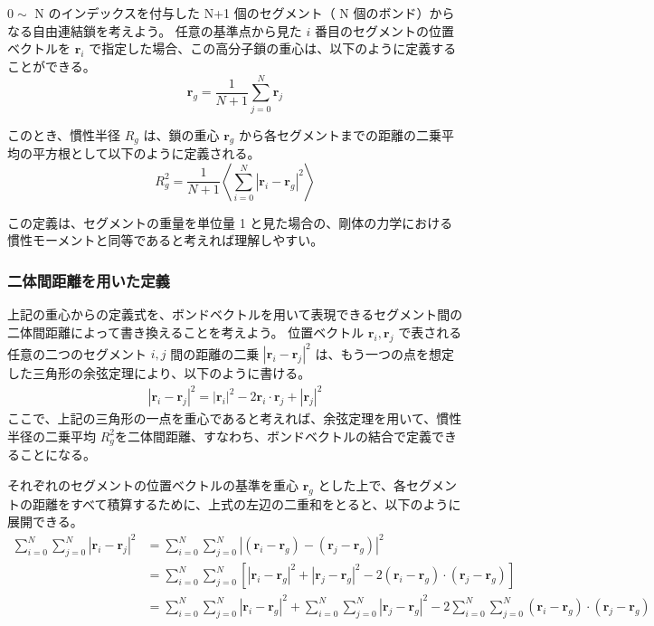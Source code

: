 \documentclass[a4paper,11pt]{ltjsarticle}
\begin{document}
\begin{appendix}
$0\sim$ N のインデックスを付与した N+1 個のセグメント（ N 個のボンド）からなる自由連結鎖を考えよう。
任意の基準点から見た $i$ 番目のセグメントの位置ベクトルを $\bm{r}_i$ で指定した場合、この高分子鎖の重心は、以下のように定義することができる。
\begin{equation*}
\bm{r}_g = \dfrac{1}{N+1} \sum_{j=0}^{N} \bm{r}_j
\end{equation*}

このとき、慣性半径 $R_g$ は、鎖の重心 $\bm{r}_g$ から各セグメントまでの距離の二乗平均の平方根として以下のように定義される。
\begin{equation*}
R_g^2 = \dfrac{1}{N+1} \left\langle \sum_{i=0}^{N} |\bm{r}_i - \bm{r}_g|^2 \right\rangle
\end{equation*}

この定義は、セグメントの重量を単位量 1 と見た場合の、剛体の力学における慣性モーメントと同等であると考えれば理解しやすい。

\subsubsection{二体間距離を用いた定義}

上記の重心からの定義式を、ボンドベクトルを用いて表現できるセグメント間の二体間距離によって書き換えることを考えよう。
位置ベクトル $\bm{r}_{i}, \bm{r}_{j}$ で表される任意の二つのセグメント $i, j$ 間の距離の二乗 $|\bm{r}_{i} - \bm{r}_{j}|^2$ は、もう一つの点を想定した三角形の余弦定理により、以下のように書ける。 
\begin{align*}
|\bm{r}_{i} - \bm{r}_{j}|^2 = |\bm{r}_{i}|^2 - 2 \bm{r}_{i}\cdot\bm{r}_{j} + |\bm{r}_{j}|^2
\end{align*}
ここで、上記の三角形の一点を重心であると考えれば、余弦定理を用いて、慣性半径の二乗平均 $R_g^2$を二体間距離、すなわち、ボンドベクトルの結合で定義できることになる。

それぞれのセグメントの位置ベクトルの基準を重心 $\bm{r}_g$ とした上で、各セグメントの距離をすべて積算するために、上式の左辺の二重和をとると、以下のように展開できる。
\begin{align*}
\sum_{i = 0}^N \sum_{j=0}^N \left| \bm{r}_i - \bm{r}_j \right|^2
	&= \sum_{i = 0}^N \sum_{j=0}^N  \left| (\bm{r}_i - \bm{r}_g) - (\bm{r}_j - \bm{r}_g) \right|^2 \\
	&= \sum_{i = 0}^N \sum_{j=0}^N \left[ \left| \bm{r}_i - \bm{r}_g \right|^2 + \left|\bm{r}_j - \bm{r}_g \right|^2 
		-2 (\bm{r}_i - \bm{r}_g) \cdot (\bm{r}_j - \bm{r}_g) \right] \\
	&= \sum_{i = 0}^N \sum_{j=0}^N \left| \bm{r}_i - \bm{r}_g \right|^2 + \sum_{i = 0}^N \sum_{j=0}^N \left|\bm{r}_j - \bm{r}_g \right|^2 
		-2 \sum_{i = 0}^N \sum_{j=0}^N (\bm{r}_i - \bm{r}_g) \cdot (\bm{r}_j - \bm{r}_g)
\end{align*}


\end{appendix}
\end{document}
